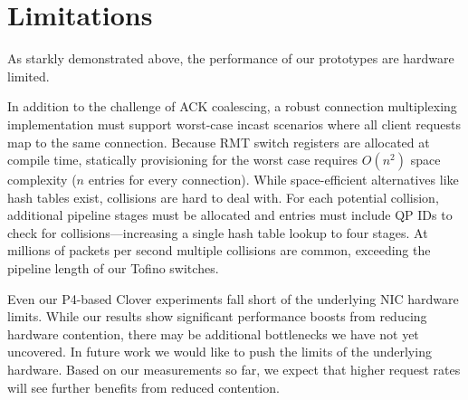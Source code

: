 \section{Limitations}

As starkly demonstrated above, the performance  of
our {\sword} prototypes are hardware limited.
%

In addition to the challenge of ACK coalescing, a robust connection
multiplexing implementation must support worst-case incast
scenarios where all client requests map to the same connection.
Because RMT switch registers are allocated at compile time,
statically provisioning for the worst case requires $O(n^2)$
space complexity ($n$ entries for every connection).
While space-efficient alternatives like hash tables exist,
collisions
are hard to deal with. For each potential collision,
additional pipeline stages must be allocated and entries
must include QP IDs to check for collisions---increasing a
single hash table lookup to four stages.
At millions of packets per second multiple collisions are common,
exceeding the pipeline length of our Tofino switches.


Even our P4-based Clover experiments fall short of the underlying NIC hardware
limits.  While our results show significant performance boosts from
reducing hardware contention, there may be additional bottlenecks we
have not yet uncovered. In future work we would like to push the limits of the underlying hardware.
Based on our measurements so far, we expect that higher request rates
will see further benefits from reduced contention.

